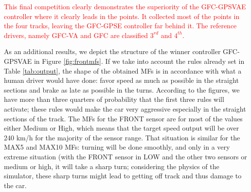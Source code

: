 \documentclass[10pt,journal,compsoc]{IEEEtran}
\begin{document}
\textcolor{red}{
This final competition clearly demonstrates the superiority of the {\sf GFC-GPSVAE} controller where it clearly leads in the points. It collected most of the points in the four tracks, leaving the {\sf GFC-GPSE} controller far behind it. The reference drivers, namely {\sf GFC-VA} and {\sf GFC}  are classified $3^{rd}$ and $4^{th}$.
}


As an additional results, we depict the structure of the winner controller {\sf GFC-GPSVAE} in Figure \ref{fig:frontmfs}. 
If we take into account the rules already set in Table
\ref{tab:output}, the shape of the obtained MFs  is in accordance with
what a human driver would have done: favor speed as much as possible
in the straight sections and brake as late as possible in the turns. 
According to the figures, we have more than three quarters of
probability that the first three rules will activate; these rules
would make the car very aggressive especially in the straight sections
of the track. The MFs for the FRONT sensor are for most of the values
either Medium or High, which means that the target speed output will
be over 240 km/h for the majority of the sensor range. 
That situation is similar for the MAX5 and MAX10 MFs: turning will be done smoothly, and only in a very extreme situation (with the FRONT sensor in LOW and
the other two sensors or medium or high, it will take a sharp turn;
considering the physics of the simulator, these sharp turns might lead
to getting off track and thus damage to the car.
\end{document}
